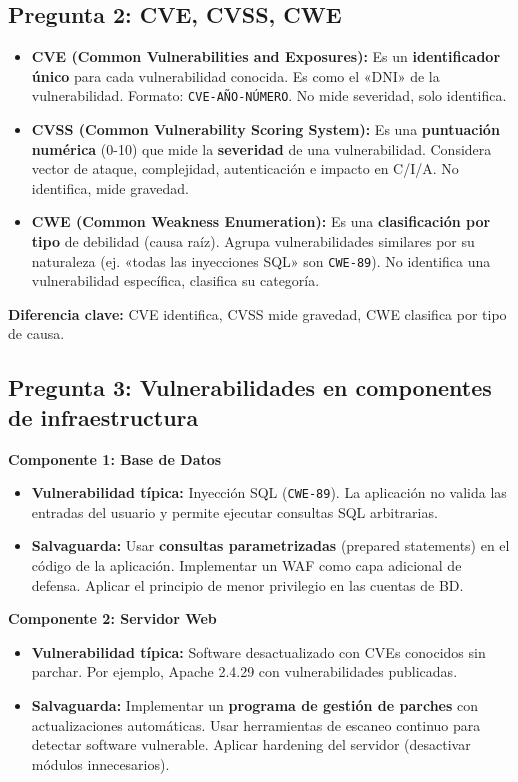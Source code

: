 \documentclass[11pt,a4paper]{article}
\begin{document}
\subsection*{Pregunta 2: CVE, CVSS, CWE}
\begin{respuesta}
\begin{itemize}[leftmargin=*]
  \item \textbf{CVE (Common Vulnerabilities and Exposures):} Es un \textbf{identificador único} para cada vulnerabilidad conocida. Es como el «DNI» de la vulnerabilidad. Formato: \texttt{CVE-AÑO-NÚMERO}. No mide severidad, solo identifica.
  \item \textbf{CVSS (Common Vulnerability Scoring System):} Es una \textbf{puntuación numérica} (0-10) que mide la \textbf{severidad} de una vulnerabilidad. Considera vector de ataque, complejidad, autenticación e impacto en C/I/A. No identifica, mide gravedad.
  \item \textbf{CWE (Common Weakness Enumeration):} Es una \textbf{clasificación por tipo} de debilidad (causa raíz). Agrupa vulnerabilidades similares por su naturaleza (ej. «todas las inyecciones SQL» son \texttt{CWE-89}). No identifica una vulnerabilidad específica, clasifica su categoría.
\end{itemize}

\textbf{Diferencia clave:} CVE identifica, CVSS mide gravedad, CWE clasifica por tipo de causa.
\end{respuesta}

\subsection*{Pregunta 3: Vulnerabilidades en componentes de infraestructura}
\begin{respuesta}
\textbf{Componente 1: Base de Datos}
\begin{itemize}[leftmargin=*]
  \item \textbf{Vulnerabilidad típica:} Inyección SQL (\texttt{CWE-89}). La aplicación no valida las entradas del usuario y permite ejecutar consultas SQL arbitrarias.
  \item \textbf{Salvaguarda:} Usar \textbf{consultas parametrizadas} (prepared statements) en el código de la aplicación. Implementar un WAF como capa adicional de defensa. Aplicar el principio de menor privilegio en las cuentas de BD.
\end{itemize}

\textbf{Componente 2: Servidor Web}
\begin{itemize}[leftmargin=*]
  \item \textbf{Vulnerabilidad típica:} Software desactualizado con CVEs conocidos sin parchar. Por ejemplo, Apache 2.4.29 con vulnerabilidades publicadas.
  \item \textbf{Salvaguarda:} Implementar un \textbf{programa de gestión de parches} con actualizaciones automáticas. Usar herramientas de escaneo continuo para detectar software vulnerable. Aplicar hardening del servidor (desactivar módulos innecesarios).
\end{itemize}
\end{respuesta}
\end{document}

